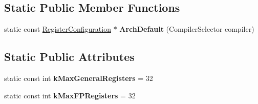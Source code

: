 \subsection*{Static Public Member Functions}
\begin{DoxyCompactItemize}
\item 
static const \hyperlink{classv8_1_1internal_1_1_register_configuration}{Register\+Configuration} $\ast$ {\bfseries Arch\+Default} (Compiler\+Selector compiler)\hypertarget{classv8_1_1internal_1_1_register_configuration_a58845087c742900bb8043e11b43664a2}{}\label{classv8_1_1internal_1_1_register_configuration_a58845087c742900bb8043e11b43664a2}

\end{DoxyCompactItemize}
\subsection*{Static Public Attributes}
\begin{DoxyCompactItemize}
\item 
static const int {\bfseries k\+Max\+General\+Registers} = 32\hypertarget{classv8_1_1internal_1_1_register_configuration_a3b10debb30305d9a271e6f8fd3799358}{}\label{classv8_1_1internal_1_1_register_configuration_a3b10debb30305d9a271e6f8fd3799358}

\item 
static const int {\bfseries k\+Max\+F\+P\+Registers} = 32\hypertarget{classv8_1_1internal_1_1_register_configuration_ab9d7bc028391a2aac45f1cbebbba8118}{}\label{classv8_1_1internal_1_1_register_configuration_ab9d7bc028391a2aac45f1cbebbba8118}

\end{DoxyCompactItemize}
